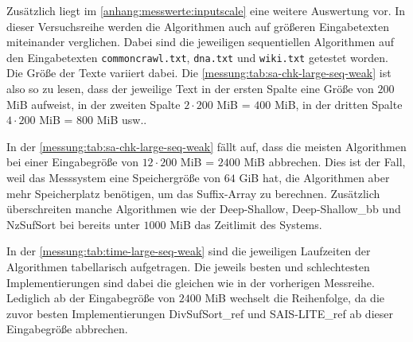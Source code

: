 Zusätzlich liegt im \cref{anhang:messwerte:inputscale} eine weitere Auswertung vor. In dieser Versuchsreihe werden die Algorithmen auch auf größeren Eingabetexten miteinander verglichen. Dabei sind die jeweiligen sequentiellen Algorithmen auf den Eingabetexten \texttt{commoncrawl.txt}, \texttt{dna.txt} und \texttt{wiki.txt} getestet worden. Die Größe der Texte variiert dabei. Die \cref{messung:tab:sa-chk-large-seq-weak} ist also so zu lesen, dass der jeweilige Text in der ersten Spalte eine Größe von $200$ MiB aufweist, in der zweiten Spalte $2\cdot200$ MiB = $400$ MiB, in der dritten Spalte $4\cdot200$ MiB = $800$ MiB usw..

In der \cref{messung:tab:sa-chk-large-seq-weak} fällt auf, dass die meisten Algorithmen bei einer Eingabegröße von $12\cdot200$ MiB = $2400$ MiB abbrechen. Dies ist der Fall, weil das Messsystem eine Speichergröße von $64$ GiB hat, die Algorithmen aber mehr Speicherplatz benötigen, um das Suffix-Array zu berechnen. Zusätzlich überschreiten manche Algorithmen wie der Deep-Shallow, Deep-Shallow\_bb und NzSufSort bei bereits unter $1000$ MiB das Zeitlimit des Systems.

In der \cref{messung:tab:time-large-seq-weak} sind die jeweiligen Laufzeiten der Algorithmen tabellarisch aufgetragen. Die jeweils besten und schlechtesten Implementierungen sind dabei die gleichen wie in der vorherigen Messreihe. Lediglich ab der Eingabegröße von $2400$ MiB wechselt die Reihenfolge, da die zuvor besten Implementierungen DivSufSort\_ref und SAIS-LITE\_ref ab dieser Eingabegröße abbrechen.
